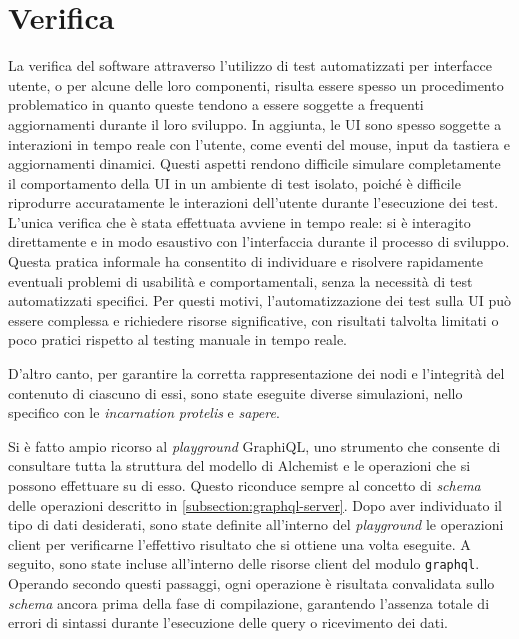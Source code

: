 \section{Verifica}
La verifica del software attraverso l'utilizzo di test automatizzati per interfacce utente, o per alcune delle loro componenti, risulta essere spesso un procedimento problematico in quanto queste tendono a essere soggette a frequenti aggiornamenti durante il loro sviluppo. In aggiunta, le \ac{UI} sono spesso soggette  a interazioni in tempo reale con l'utente, come eventi del mouse, input da tastiera e aggiornamenti dinamici. Questi aspetti rendono difficile simulare completamente il comportamento della \ac{UI} in un ambiente di test isolato, poiché è difficile riprodurre accuratamente le interazioni dell'utente durante l'esecuzione dei test. L'unica verifica che è stata effettuata avviene in tempo reale: si è interagito direttamente e in modo esaustivo con l'interfaccia durante il processo di sviluppo. Questa pratica informale ha consentito di individuare e risolvere rapidamente eventuali problemi di usabilità e comportamentali, senza la necessità di test automatizzati specifici. 
Per questi motivi, l'automatizzazione dei test sulla UI può essere complessa e richiedere risorse significative, con risultati talvolta limitati o poco pratici rispetto al testing manuale in tempo reale.

D'altro canto, per garantire la corretta rappresentazione dei nodi e l'integrità del contenuto di ciascuno di essi, sono state eseguite diverse simulazioni, nello specifico con le \textit{incarnation} \textit{protelis} e \textit{sapere}.

Si è fatto ampio ricorso al \textit{playground} GraphiQL, uno strumento che consente di consultare tutta la struttura del modello di Alchemist e le operazioni che si possono effettuare su di esso. Questo riconduce sempre al concetto di \textit{schema} delle operazioni descritto in \ref{subsection:graphql-server}. 
Dopo aver individuato il tipo di dati desiderati, sono state definite all'interno del \textit{playground} le operazioni client per verificarne l’effettivo risultato che si ottiene una volta eseguite. 
A seguito, sono state incluse all’interno delle risorse client del modulo \texttt{graphql}. 
Operando secondo questi passaggi, ogni operazione è risultata convalidata sullo \textit{schema} ancora prima della fase di compilazione, garantendo l'assenza totale di errori di sintassi durante l'esecuzione delle query o ricevimento dei dati. 





